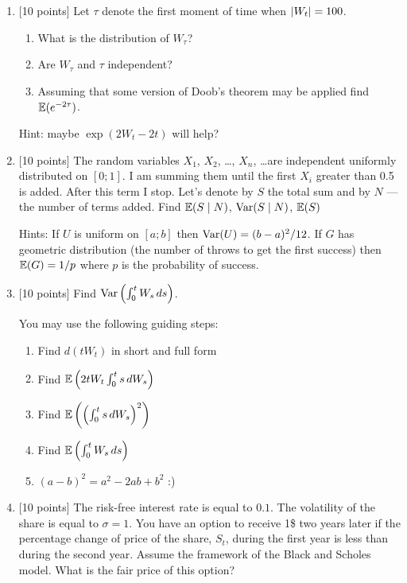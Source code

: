 \documentclass[12pt, a4paper]{article}
\DeclarePairedDelimiter{\abs}{\lvert}{\rvert}
\begin{document}
\begin{enumerate}


\item $[$10 points] Let $\tau$ denote the first moment of time when $\abs{W_t}=100$.
\begin{enumerate}
\item What is the distribution of $W_{\tau}$?
\item Are $W_{\tau}$ and $\tau$ independent?
\item Assuming that some version of Doob's theorem may be applied find $\operatorname{\mathbb{E}}(e^{-2\tau})$.
\end{enumerate}
Hint: maybe $\exp(2 W_t - 2 t )$ will help?


\item $[$10 points] The random variables $X_1$, $X_2$, \ldots, $X_n$, \ldots are independent uniformly distributed on $[0; 1]$. I am summing them until the first $X_i$ greater than 0.5 is added. After this term I stop. 
Let's denote by $S$ the total sum and by $N$ — the number of terms added. 
Find $\operatorname{\mathbb{E}}(S \mid N)$, $\operatorname{Var}(S \mid N)$, $\operatorname{\mathbb{E}}(S)$ %

Hints: If $U$ is uniform on $[a;b]$ then $\operatorname{Var}(U)=(b-a)^2/12$. If $G$ has geometric distribution (the number of throws to get the first success) then $\operatorname{\mathbb{E}}(G)=1/p$  where $p$  is the probability of success.

\item $[$10 points] Find $\operatorname{Var}\left(  \int_0^t W_s \, ds  \right)$.

You may use the following guiding steps:

\begin{enumerate}
\item Find $d(tW_t)$ in short and full form
\item Find $\operatorname{\mathbb{E}}\left(2t W_t\int_0^t s \, dW_s\right)$
\item Find $\operatorname{\mathbb{E}}\left(\left(\int_0^t s \, dW_s\right)^2 \right)$
\item Find $\operatorname{\mathbb{E}}\left(  \int_0^t W_s \, ds  \right)$
\item $(a-b)^2=a^2-2ab+b^2$ :)
\end{enumerate}

\item {[10 points]} The risk-free interest rate is equal to $0.1$. 
The volatility of the share is equal to $\sigma=1$. 
You have an option to receive 1\$ two years later if the percentage change of price of the share, $S_t$, during the first year is less than during the second year. 
Assume the framework of the Black and Scholes model. 
What is the fair price of this option?


\end{enumerate}
\end{document}

